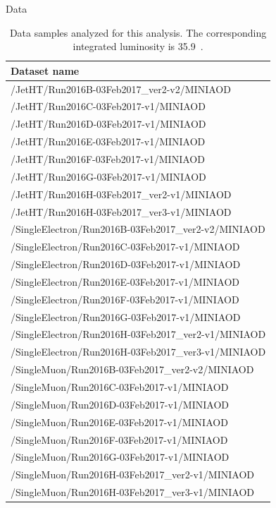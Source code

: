 \begin{section}{Data}
\begin{table}[bt!]
\begin{center}
\begin{tabular}{l}
\hline \hline
Dataset name                                        \\ 
\hline
/JetHT/Run2016B-03Feb2017\_ver2-v2/MINIAOD          \\
/JetHT/Run2016C-03Feb2017-v1/MINIAOD                \\
/JetHT/Run2016D-03Feb2017-v1/MINIAOD                \\
/JetHT/Run2016E-03Feb2017-v1/MINIAOD                \\
/JetHT/Run2016F-03Feb2017-v1/MINIAOD                \\
/JetHT/Run2016G-03Feb2017-v1/MINIAOD                \\
/JetHT/Run2016H-03Feb2017\_ver2-v1/MINIAOD          \\
/JetHT/Run2016H-03Feb2017\_ver3-v1/MINIAOD          \\

/SingleElectron/Run2016B-03Feb2017\_ver2-v2/MINIAOD \\
/SingleElectron/Run2016C-03Feb2017-v1/MINIAOD       \\
/SingleElectron/Run2016D-03Feb2017-v1/MINIAOD       \\
/SingleElectron/Run2016E-03Feb2017-v1/MINIAOD       \\
/SingleElectron/Run2016F-03Feb2017-v1/MINIAOD       \\
/SingleElectron/Run2016G-03Feb2017-v1/MINIAOD       \\
/SingleElectron/Run2016H-03Feb2017\_ver2-v1/MINIAOD \\
/SingleElectron/Run2016H-03Feb2017\_ver3-v1/MINIAOD \\

/SingleMuon/Run2016B-03Feb2017\_ver2-v2/MINIAOD     \\
/SingleMuon/Run2016C-03Feb2017-v1/MINIAOD           \\
/SingleMuon/Run2016D-03Feb2017-v1/MINIAOD           \\
/SingleMuon/Run2016E-03Feb2017-v1/MINIAOD           \\
/SingleMuon/Run2016F-03Feb2017-v1/MINIAOD           \\
/SingleMuon/Run2016G-03Feb2017-v1/MINIAOD           \\
/SingleMuon/Run2016H-03Feb2017\_ver2-v1/MINIAOD     \\
/SingleMuon/Run2016H-03Feb2017\_ver3-v1/MINIAOD     \\
\hline \hline
\end{tabular}
\caption{Data samples analyzed for this analysis.
The corresponding integrated luminosity is 35.9~\ifb.}
\label{tab:data_samples}
\end{center}
\end{table}

\end{section}

